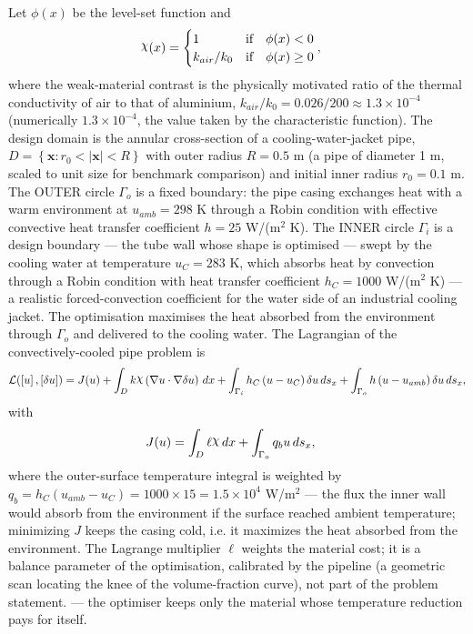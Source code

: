 \documentclass[preview]{standalone}
\let\oldcdot\cdot
\let\cdot\oldcdot
\begin{document}
Let $\phi(x)$ be the level-set function and
 \begin{align*}\raisebox{\depth}{$\chi$}(x) &= \begin{cases} 1 & \mbox{if}\quad \phi(x) < 0 \\ k_{air}/k_0 & \mbox{if}\quad \phi(x)  \ge 0 \end{cases},\end{align*}
where the weak-material contrast is the physically motivated ratio of the thermal conductivity of air to that of aluminium, $k_{air}/k_0 = 0.026/200 \approx 1.3 \times 10^{-4}$ (numerically $1.3 \times 10^{-4}$, the value taken by the characteristic function).
The design domain is the annular cross-section of a cooling-water-jacket pipe, $D = \left\{ \mathbf x : r_0 < \left|\mathbf x\right| < R \right\}$ with outer radius $R = 0.5$ m (a pipe of diameter 1 m, scaled to unit size for benchmark comparison) and initial inner radius $r_0 = 0.1$ m.  The OUTER circle $\Gamma_o$ is a fixed boundary: the pipe casing exchanges heat with a warm environment at $u_{amb} = 298$ K through a Robin condition with effective convective heat transfer coefficient $h = 25$ W/(m$^{2}$ K).  The INNER circle $\Gamma_i$ is a design boundary — the tube wall whose shape is optimised — swept by the cooling water at temperature $u_C = 283$ K, which absorbs heat by convection through a Robin condition with heat transfer coefficient $h_C = 1000$ W/(m$^{2}$ K) — a realistic forced-convection coefficient for the water side of an industrial cooling jacket.  The optimisation maximises the heat absorbed from the environment through $\Gamma_o$ and delivered to the cooling water.
The Lagrangian of the convectively-cooled pipe problem is
\begin{dmath*}
\mathcal L(\left[ u\right],\left[ \delta u\right]) = J(u) +  \int_{D} k \raisebox{\depth}{$\chi$} \left(  \nabla u  \cdot  \nabla \delta u  \right) \,dx + \int_{\Gamma_i} h_C \left( u - u_{C}\right) \delta u \,ds_x + \int_{\Gamma_o} h \left( u - u_{amb}\right) \delta u \,ds_x ,
\end{dmath*}
with
\begin{align*}
J(u) &=  \int_{D} \ell \raisebox{\depth}{$\chi$} \,dx + \int_{\Gamma_o} q_b u \,ds_x ,
 \end{align*}
where the outer-surface temperature integral is weighted by $q_b = h_C \left( u_{amb} - u_{C}\right) = 1000 \times 15 = 1.5 \times 10^{4}$ W/m$^{2}$ — the flux the inner wall would absorb from the environment if the surface reached ambient temperature; minimizing $J$ keeps the casing cold, i.e. it maximizes the heat absorbed from the environment.  The Lagrange multiplier $\ell$ weights the material cost; it is a balance parameter of the optimisation, calibrated by the pipeline (a geometric scan locating the knee of the volume-fraction curve), not part of the problem statement. — the optimiser keeps only the material whose temperature reduction pays for itself.
\end{document}
